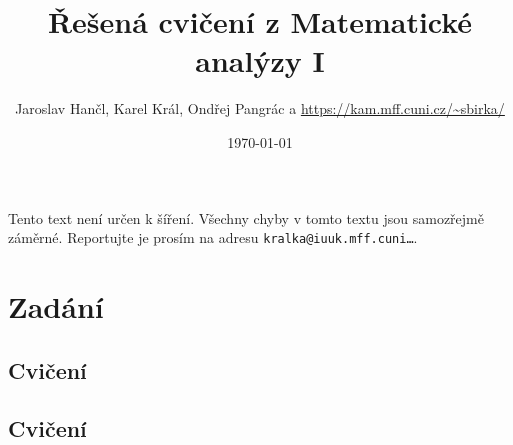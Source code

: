 \documentclass[a4paper,10pt]{book}
\title{Řešená cvičení z Matematické analýzy I}
\author{Jaroslav Hančl, Karel Král, Ondřej Pangrác a \url{https://kam.mff.cuni.cz/~sbirka/}}
\date{\today}
\begin{document}
\newtheorem{theorem}{Věta}
\newtheorem{lemma}[theorem]{Lemma}
\newtheorem{conjecture}[theorem]{Domněnka}
\newtheorem{observation}[theorem]{Pozorování}
\newtheorem{corollary}[theorem]{Důsledek}
\newtheorem*{definition}{Definice}

 \maketitle

 \vskip 1cm

 Tento text není určen k šíření.
 Všechny chyby v tomto textu jsou samozřejmě záměrné. Reportujte je prosím na adresu
 {\tt kralka@iuuk.mff.cuni\ldots}.

 \vskip 2cm
 \tableofcontents

 \newcommand{\dx}{\ dx}
 \newcommand{\dt}{\ dt}
 \newcommand{\ds}{\ ds}
 \newcommand{\du}{\ du}
 \newcommand{\dv}{\ dv}

 \newcommand{\dif}{\, \mathrm{d}} %
 \newcommand{\id}{\, \mathrm{id}} %
 \newcommand{\sgn}{\, \mathrm{sgn}} %
 \newcommand{\med}{\, \mathrm{med}} %
 \newcommand{\conv}{\, \mathrm{conv}} %
 \newcommand{\supp}{\, \mathrm{Supp}} %
 \newcommand{\Ker}{\, \mathrm{Ker}} %
 \renewcommand{\Im}{\, \mathrm{Im}} %
 \newcommand{\R}{\, \mathcal{R}} %

	\eject

\chapter{Zadání}
	\newcommand{\solution}[1]{}
	\newcommand{\exercise}[2]{ %
		

		Řešení: \ref{sol:#2}
	}
	\section[1. Cvičení]{Cvičení}
 
	\section[2. Cvičení]{Cvičení}
 
\end{document}
